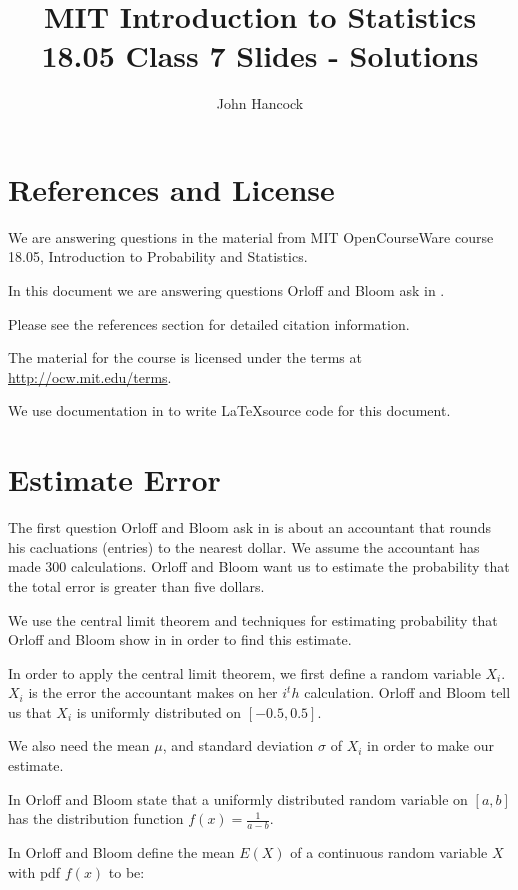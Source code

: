 \documentclass[a4paper,11pt]{article}
\author{John Hancock}
\title{MIT Introduction to Statistics 18.05 Class 7 Slides - Solutions}
\begin{document}
\maketitle
\tableofcontents
\section{References and License}
We are answering questions in the material from MIT OpenCourseWare
course 18.05, Introduction to Probability and Statistics.

In this document we are answering questions Orloff and Bloom ask in
\cite{slides7}.

Please see the references section for detailed citation information.

The material for the course is licensed under the terms at
\url{http://ocw.mit.edu/terms}.

We use documentation in  \cite{logicNot} to write \LaTeX source code for this
document.

\section{Estimate Error}
The first question Orloff and Bloom ask in \cite{slides7} is about an
accountant that rounds his cacluations (entries) to the nearest dollar.  We
assume the accountant has made 300 calculations.  Orloff and Bloom want us
to estimate the probability that the total error is greater than five
dollars.

We use the central limit theorem \cite{reading6b} and techniques for estimating
probability that Orloff and Bloom show in \cite{reading6b} in order to find
this estimate.

In order to apply the central limit theorem, we first define a random variable
$X_i$.  $X_i$ is the error the accountant makes on her $i^th$ calculation.
Orloff and Bloom tell us that $X_i$ is uniformly distributed on
$\left[-0.5, 0.5 \right]$.

We also need the mean $\mu$, and standard deviation $\sigma$ of $X_i$ in order
to make our estimate.

In \cite{reading5c} Orloff and Bloom state that a uniformly distributed random
variable on $\left[a, b \right]$ has the distribution function
$f\left(x \right) = \frac{1}{a-b}$.

In \cite{reading6a} Orloff and Bloom define the mean $E\left(X \right)$ of a
continuous random variable $X$ with pdf $f\left(x \right)$ to be:
\end{document}
